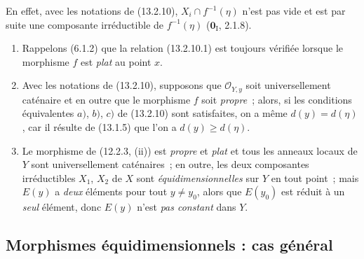 En effet, avec les notations de (13.2.10), $X_i\cap f^{-1}(\eta)$ n'est pas
vide et est par suite une composante irréductible de $f^{-1}(\eta)$
($\mathbf 0_{\mathrm I}$, 2.1.8).

\begin{remarks}[13.2.12]
\label{IV.13.2.12-fr}
\begin{enumerate}[label=(\roman*)]
  \item Rappelons (6.1.2) que la relation (13.2.10.1) est toujours vérifiée
  lorsque le morphisme $f$ est \emph{plat} au point $x$.
  \item Avec les notations de (13.2.10), supposons que $\mathcal O_{Y,y}$ soit
  universellement caténaire et en outre que le morphisme $f$ soit \emph{propre}~;
  alors, si les conditions équivalentes $a)$, $b)$, $c)$ de (13.2.10) sont
  satisfaites, on a même $d(y)=d(\eta)$, car il résulte de (13.1.5) que l'on a
  $d(y)\geq d(\eta)$.
  \item Le morphisme de (12.2.3, (ii)) est \emph{propre} et \emph{plat} et tous
  les anneaux locaux de $Y$ sont universellement caténaires~; en outre, les deux
  composantes irréductibles $X_1$, $X_2$ de $X$ sont \emph{équidimensionnelles}
  sur $Y$ en tout point~; mais $E(y)$ a \emph{deux} éléments pour tout
  $y\neq y_0$, alors que $E(y_0)$ est réduit à un \emph{seul} élément, donc
  $E(y)$ n'est \emph{pas constant} dans $Y$.
\end{enumerate}
\end{remarks}

\subsection{Morphismes équidimensionnels : cas général}
\label{subsection:IV.13.3-fr}

